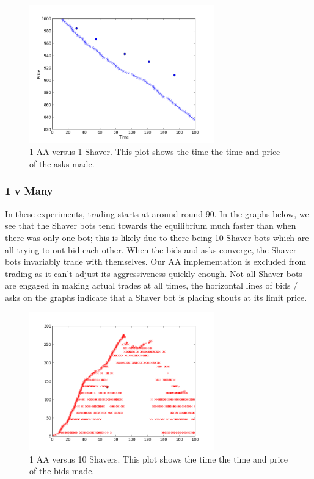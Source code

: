 \documentclass{acm_proc_article-sp}
\begin{document}
\begin{figure}[h!] \includegraphics[width=80mm]{SHVR1AA1_180_all_asks.png}
\caption {1 AA versus 1 Shaver. This plot shows the time the time and price of the asks made.}
\end{figure}

\subsubsection{1 v Many} In these experiments, trading starts at around round
90. In the graphs below, we see that the Shaver bots tend towards the
equilibrium much faster than when there was only one bot; this is likely due to
there being 10 Shaver bots which are all trying to out-bid each other. When the
bids and asks converge, the Shaver bots invariably trade with themselves. Our
AA implementation is excluded from trading as it can't adjust its
aggressiveness quickly enough. Not all Shaver bots are engaged in making actual
trades at all times, the horizontal lines of bids / asks on the graphs indicate
that a Shaver bot is placing shouts at its limit price.

\begin{figure}[h!] \includegraphics[width=80mm]{SHVR10AA1_180_all_bids.png}
\caption {1 AA versus 10 Shavers. This plot shows the time the time and price of the bids made.}
\end{figure}
\end{document}
